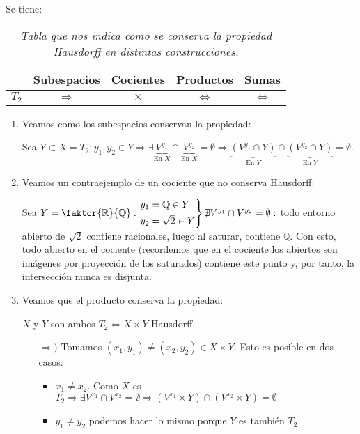 Se tiene:
\begin{table}[H]
\centering
\begin{tabular}{| c | c | c | c | c |}
    \hline
    & Subespacios & Cocientes & Productos & Sumas\\
    \hline
    $T_2$ & $\Rightarrow$ & $\times$ & $\Leftrightarrow$ & $\Leftrightarrow$\\
    \hline
\end{tabular}
\caption{\textit{Tabla que nos indica como se conserva la propiedad Hausdorff en distintas construcciones.}}
\end{table}
\begin{demo}
\begin{enumerate}
    \item\label{it:subespacio_hausdorff} Veamos como los subespacios conservan la propiedad: 

    Sea $Y \subset X = T_2: y_1, y_2 \in Y \Rightarrow \exists \underbrace{V^{y_1}}_{\text{En } X}  \cap \underbrace{V^{y_2}}_{\text{En } X} = \emptyset \Rightarrow \underbrace{\left( V^{y_1} \cap Y \right)}_{\text{En } Y}  \cap \underbrace{\left( V^{y_2} \cap Y \right)}_{\text{En } Y} = \emptyset$.

    \item Veamos un contraejemplo de un cociente que no conserva Hausdorff: 

    Sea $Y = \faktor{\mathbb{R}}{\mathbb{Q}}: \begin{rcases}
        y_1 = \mathbb{Q} \in Y\\
        y_2 = \sqrt{2} \in Y
    \end{rcases} \nexists V^{y_1} \cap V^{y_2} = \emptyset: $ todo entorno abierto de $\sqrt{2}$ contiene racionales, luego al saturar, contiene $\mathbb{Q}$. Con esto, todo abierto en el cociente (recordemos que en el cociente los abiertos son imágenes por proyección de los saturados) contiene este punto y, por tanto, la intersección nunca es disjunta.

    \item Veamos que el producto conserva la propiedad: 

    $X$ y $Y$ son ambos $T_2 \Leftrightarrow X \times Y$ Hausdorff.
    \begin{itemize}
        \item[$\Rightarrow)$] Tomamos $\left( x_1, y_1 \right) \neq \left( x_2, y_2 \right) \in X \times Y$. Esto es posible en dos casos:
        \begin{itemize}
            \item $x_1 \neq x_2$. Como $X$ es $T_2 \Rightarrow \exists V^{x_1} \cap V^{x_2} = \emptyset \Rightarrow \left( V^{x_1} \times Y \right) \cap \left( V^{x_2} \times Y \right) = \emptyset$ 
            \item $y_1 \neq y_2$ podemos hacer lo mismo porque $Y$ es también $T_2$.
        \end{itemize}


\end{itemize}
\end{enumerate}
\end{demo}
